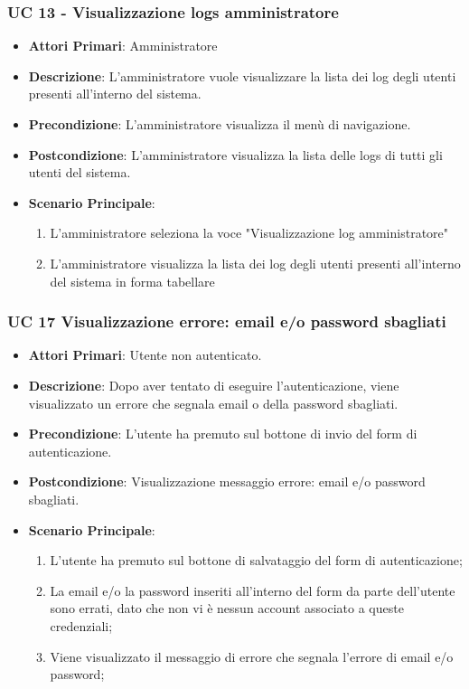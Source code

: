 		\subsubsection{UC 13 - Visualizzazione logs amministratore}
		\begin{itemize}
			\item \textbf{Attori Primari}: Amministratore
			\item \textbf{Descrizione}: L'amministratore vuole visualizzare la lista dei log degli utenti presenti all'interno del sistema.
			\item \textbf{Precondizione}: L'amministratore visualizza il menù di navigazione.
			\item \textbf{Postcondizione}: L'amministratore visualizza la lista delle logs di tutti gli utenti del sistema.
			\item \textbf{Scenario Principale}:
			\begin{enumerate}
				\item{L'amministratore seleziona la voce "Visualizzazione log amministratore"}
				\item{L'amministratore visualizza la lista dei log degli utenti presenti all'interno del sistema in forma tabellare}
			\end{enumerate}	
		\end{itemize}
		





		\subsubsection{UC 17 Visualizzazione errore: email e/o password sbagliati}
		\begin{itemize}
			\item \textbf{Attori Primari}: Utente non autenticato.
			\item \textbf{Descrizione}: Dopo aver tentato di eseguire l'autenticazione, viene visualizzato un errore che segnala email o della password sbagliati.
			\item \textbf{Precondizione}: L'utente ha premuto sul bottone di invio del form di autenticazione.
			\item \textbf{Postcondizione}: Visualizzazione messaggio errore: email e/o password sbagliati.
			\item \textbf{Scenario Principale}:
			\begin{enumerate}
				\item L'utente ha premuto sul bottone di salvataggio del form  di autenticazione;
				\item La email e/o la password inseriti all'interno del form da parte dell'utente sono errati, dato che non vi è nessun account associato a queste credenziali;
				\item Viene visualizzato il messaggio di errore che segnala l'errore di email e/o password;
			\end{enumerate}
		\end{itemize}

